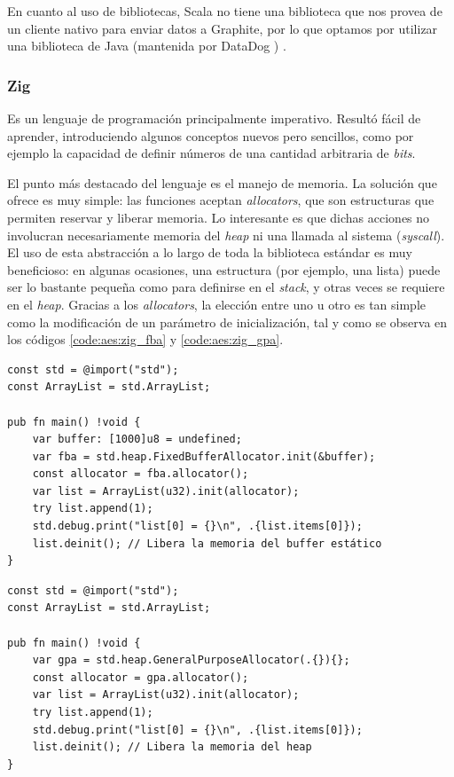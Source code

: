 \documentclass[11pt]{article}
\let\Oldsubsubsection\subsubsection
\renewcommand{\subsubsection}{\FloatBarrier\Oldsubsubsection}
\newcommand{\english}[1]{\textit{#1}}
\begin{document}
En cuanto al uso de bibliotecas, Scala no tiene una biblioteca que nos provea de un cliente nativo para enviar datos a Graphite, por lo que optamos por utilizar una biblioteca de Java (mantenida por DataDog \cite{com:datadog}) \cite{scala:lib:java-dogstatsd-client}.

\subsubsection{Zig}

Es un lenguaje de programación principalmente imperativo. Resultó fácil de aprender, introduciendo algunos conceptos nuevos pero sencillos, como por ejemplo la capacidad de definir números de una cantidad arbitraria de \english{bits}.

El punto más destacado del lenguaje es el manejo de memoria. La solución que ofrece es muy simple: las funciones aceptan \english{allocators}, que son estructuras que permiten reservar y liberar memoria. Lo interesante es que dichas acciones no involucran necesariamente memoria del \english{heap} ni una llamada al sistema (\english{syscall}). El uso de esta abstracción a lo largo de toda la biblioteca estándar es muy beneficioso: en algunas ocasiones, una estructura (por ejemplo, una lista) puede ser lo bastante pequeña como para definirse en el \english{stack}, y otras veces se requiere en el \english{heap}. Gracias a los \english{allocators}, la elección entre uno u otro es tan simple como la modificación de un parámetro de inicialización, tal y como se observa en los códigos \ref{code:aes:zig_fba} y \ref{code:aes:zig_gpa}.

\begin{listing}[h]
\begin{verbatim}
const std = @import("std");
const ArrayList = std.ArrayList;

pub fn main() !void {
    var buffer: [1000]u8 = undefined;
    var fba = std.heap.FixedBufferAllocator.init(&buffer);
    const allocator = fba.allocator();
    var list = ArrayList(u32).init(allocator);
    try list.append(1);
    std.debug.print("list[0] = {}\n", .{list.items[0]});
    list.deinit(); // Libera la memoria del buffer estático
}
\end{verbatim}
\caption{Inicialización de una lista en el \english{stack} por medio de un \lstinline{FixedBufferAllocator}, en Zig}
\label{code:aes:zig_fba}
\end{listing}

\begin{listing}[h]
\begin{verbatim}
const std = @import("std");
const ArrayList = std.ArrayList;

pub fn main() !void {
    var gpa = std.heap.GeneralPurposeAllocator(.{}){};
    const allocator = gpa.allocator();
    var list = ArrayList(u32).init(allocator);
    try list.append(1);
    std.debug.print("list[0] = {}\n", .{list.items[0]});
    list.deinit(); // Libera la memoria del heap
}
\end{verbatim}
\caption{Inicialización de una lista en el \english{heap} por medio de un \lstinline{GeneralPurposeAllocator}, en Zig}
\label{code:aes:zig_gpa}
\end{listing}
\end{document}
